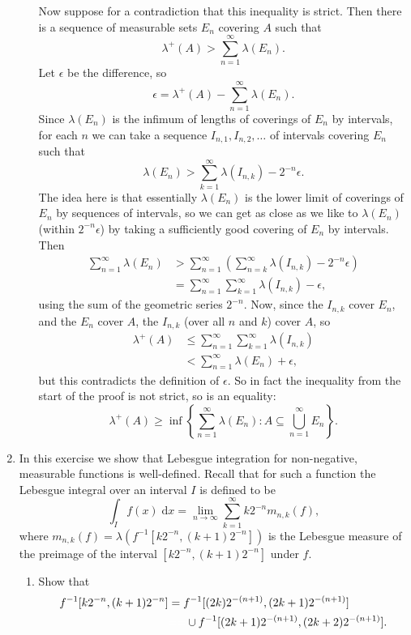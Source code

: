 \documentclass{article}
\newcommand{\diff}{\;\mathrm{d}}
\begin{document}
\begin{enumerate}
\begin{enumerate}
{							Now suppose for a contradiction that this inequality is strict. Then there is a sequence of measurable sets $E_n$ covering $A$ such that
							\[\lambda^+(A)>\sum_{n=1}^\infty \lambda(E_n).\]
							Let $\epsilon$ be the difference, so
							\[\epsilon=\lambda^+(A)-\sum_{n=1}^\infty \lambda(E_n).\]
							Since $\lambda(E_n)$ is the infimum of lengths of coverings of $E_n$ by intervals, for each $n$ we can take a sequence $I_{n,1},I_{n,2},\hdots$ of intervals covering $E_n$ such that
							\[\lambda(E_n)>\sum_{k=1}^\infty \lambda(I_{n,k})-2^{-n}\epsilon.\]
							The idea here is that essentially $\lambda(E_n)$ is the lower limit of coverings of $E_n$ by sequences of intervals, so we can get as close as we like to $\lambda(E_n)$ (within $2^{-n}\epsilon$) by taking a sufficiently good covering of $E_n$ by intervals. Then
							\begin{align*}
								\sum_{n=1}^\infty \lambda(E_n) &>\sum_{n=1}^\infty\left(\sum_{n=k}^\infty \lambda(I_{n,k})-2^{-n}\epsilon\right)\\
								&=\sum_{n=1}^\infty \sum_{k=1}^\infty \lambda(I_{n,k}) - \epsilon,
							\end{align*}
							using the sum of the geometric series $2^{-n}$.  Now, since the $I_{n,k}$ cover $E_n$, and the $E_n$ cover $A$, the $I_{n,k}$ (over all $n$ and $k$) cover $A$, so
							\begin{align*}
								\lambda^+(A)&\leq \sum_{n=1}^\infty\sum_{k=1}^\infty \lambda(I_{n,k})\\
								&< \sum_{n=1}^\infty \lambda(E_n)+\epsilon,
							\end{align*}
							but this contradicts the definition of $\epsilon$. So in fact the inequality from the start of the proof is not strict, so is an equality:
							\[\lambda^+(A)\geq \inf\left\{\sum_{n=1}^\infty \lambda(E_n):A\subseteq \bigcup_{n=1}^\infty E_n\right\}.\]
						}
					
		\end{enumerate}
	\item In this exercise we show that Lebesgue integration for non-negative, measurable functions is well-defined. Recall that for such a function the Lebesgue integral over an interval $I$ is defined to be
		\[\int_If(x)\diff x =\lim_{n\to \infty} \sum_{k=1}^\infty k2^{-n}m_{n,k}(f),\]
		where $m_{n,k}(f)=\lambda\left(f^{-1}[k2^{-n},(k+1)2^{-n}]\right)$ is the Lebesgue measure of the preimage of the interval $[k2^{-n},(k+1)2^{-n}]$ under $f$.
		\begin{enumerate}
			\item Show that
				\begin{align*}
					f^{-1}[k2^{-n},(k+1)2^{-n}]&=f^{-1}[(2k)2^{-(n+1)},(2k+1)2^{-(n+1)}]\\
					&{\color{white} = =}\cup f^{-1}[(2k+1)2^{-(n+1)},(2k+2)2^{-(n+1)}].
				\end{align*}
				

\end{enumerate}
\end{enumerate}
\end{document}
